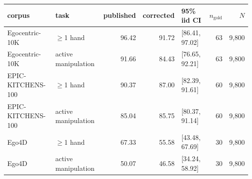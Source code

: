 \begin{tabular}{@{}llrrlrr@{}}
\toprule
corpus & task & published & corrected & 95\% iid CI & $n_{\text{gold}}$ & $N$ \\
\midrule
Egocentric-10K & $\geq$1 hand & 96.42 & 91.72 & [86.41, 97.02] & 63 & 9,800 \\
Egocentric-10K & active manipulation & 91.66 & 84.43 & [76.65, 92.21] & 63 & 9,800 \\
EPIC-KITCHENS-100 & $\geq$1 hand & 90.37 & 87.00 & [82.39, 91.61] & 60 & 9,800 \\
EPIC-KITCHENS-100 & active manipulation & 85.04 & 85.75 & [80.37, 91.14] & 60 & 9,800 \\
Ego4D & $\geq$1 hand & 67.33 & 55.58 & [43.48, 67.69] & 30 & 9,800 \\
Ego4D & active manipulation & 50.07 & 46.58 & [34.24, 58.92] & 30 & 9,800 \\
\bottomrule
\end{tabular}
